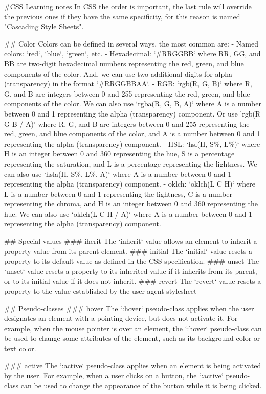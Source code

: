 #CSS Learning notes
In CSS the order is important, the last rule will override the previous ones if they have the same specificity, for this reason is named "Cascading Style Sheets".

## Color
Colors can be defined in several ways, the most common are:
- Named colors: `red`, `blue`, `green`, etc.
- Hexadecimal: `#RRGGBB` where RR, GG, and BB are two-digit hexadecimal numbers representing the red, green, and blue components of the color. And, we can use two additional digits for alpha (transparency) in the format `#RRGGBBAA`.
- RGB: `rgb(R, G, B)` where R, G, and B are integers between 0 and 255 representing the red, green, and blue components of the color. We can also use `rgba(R, G, B, A)` where A is a number between 0 and 1 representing the alpha (transparency) component.
  Or use 'rgb(R G B / A)' where R, G, and B are integers between 0 and 255 representing the red, green, and blue components of the color, and A is a number between 0 and 1 representing the alpha (transparency) component.
- HSL: `hsl(H, S\%, L\%)` where H is an integer between 0 and 360 representing the hue, S is a percentage representing the saturation, and L is a percentage representing the lightness. We can also use `hsla(H, S\%, L\%, A)` where A is a number between 0 and 1 representing the alpha (transparency) component.
- oklch: `oklch(L C H)` where L is a number between 0 and 1 representing the lightness, C is a number representing the chroma, and H is an integer between 0 and 360 representing the hue. We can also use `oklch(L C H / A)` where A is a number between 0 and 1 representing the alpha (transparency) component. 

## Special values
### iherit
The `inherit` value allows an element to inherit a property value from its parent element.
### initial
The `initial` value resets a property to its default value as defined in the CSS specification.
### unset
The `unset` value resets a property to its inherited value if it inherits from its parent, or to its initial value if it does not inherit.
### revert
The `revert` value resets a property to the value established by the user-agent stylesheet


## Pseudo-classes
### hover
The `:hover` pseudo-class applies when the user designates an element with a pointing device, but does not activate it. 
For example, when the mouse pointer is over an element, the `:hover` pseudo-class can be used to change some attributes of the element, such as its background color or text color.

### active
The `:active` pseudo-class applies when an element is being activated by the user.
For example, when a user clicks on a button, the `:active` pseudo-class can be used to change the appearance of the button while it is being clicked.

